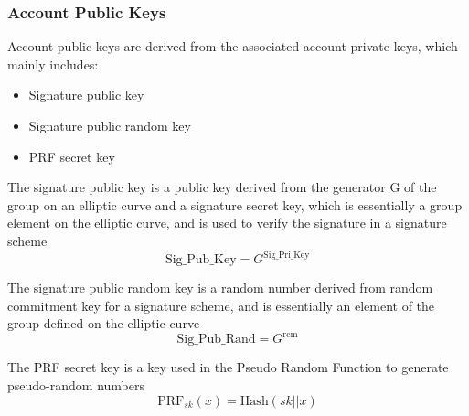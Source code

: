 \subsubsection{Account Public Keys}\label{section: account-public-keys}

Account public keys are derived from the associated account private keys, which mainly includes:

\begin{itemize}
    \item Signature public key
    \item Signature public random key
    \item PRF secret key
\end{itemize}

The signature public key is a public key derived from the generator G of the group on an elliptic curve and a signature secret key, which is essentially a group element on the elliptic curve, and is used to verify the signature in a signature scheme
\[ \mathrm{Sig\_Pub\_Key} = G^{\mathrm{Sig\_Pri\_Key}} \]

The signature public random key is a random number derived from random commitment key for a signature scheme, and is essentially an element of the group defined on the elliptic curve
\[ \mathrm{Sig\_Pub\_Rand} = G^{\mathrm{rcm}} \]

The PRF secret key is a key used in the Pseudo Random Function to generate pseudo-random numbers
\[ \mathrm{PRF}_{sk}(x) = \mathrm{Hash}(sk \mathbin{||} x) \]
